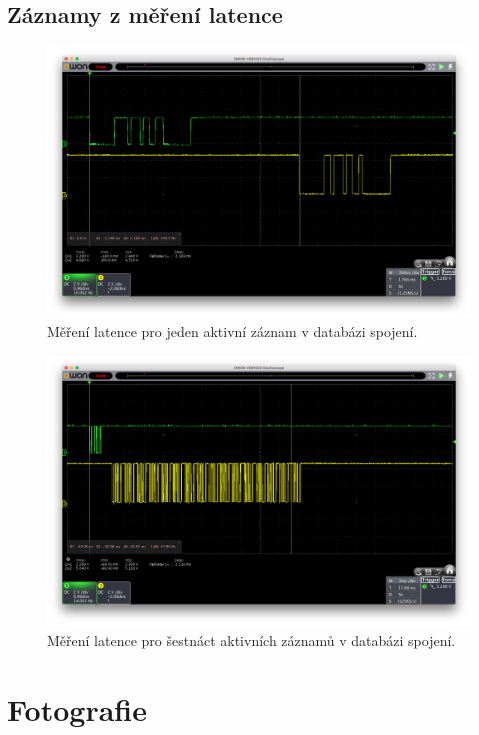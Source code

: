 \section{Záznamy z měření latence}
\begin{figure}[h]
	\centering
	\includegraphics[width=.9\textwidth]{obrazky/Mereni_1kanal.png}
	\caption{Měření latence pro jeden aktivní záznam v databázi spojení.}
	\label{fig:Latency1}
\end{figure}
\begin{figure}[h!]
	\centering
	\includegraphics[width=.9\textwidth]{obrazky/Mereni_16kanal.png}
	\caption{Měření latence pro šestnáct aktivních záznamů v databázi spojení.}
	\label{fig:Latency16}
\end{figure}

\chapter{Fotografie}
